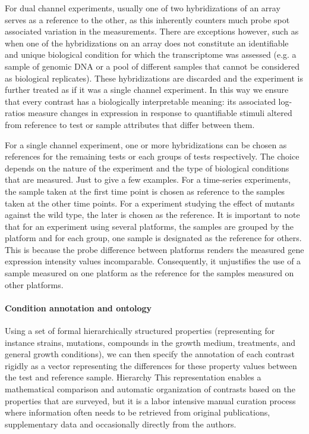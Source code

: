 For dual channel experiments, usually one of two hybridizations of an array
serves as a reference to the other, as this inherently counters much probe spot
associated variation in the measurements.
%
There are exceptions however, such as when one of the hybridizations on an
array does not constitute an identifiable and unique biological condition for
which the transcriptome was assessed (e.g. a sample of genomic DNA or a pool of
different samples that cannot be considered as biological replicates).
%
These hybridizations are discarded and the experiment is further treated as if
it was a single channel experiment.
%
In this way we ensure that every contrast has a biologically interpretable
meaning: its associated log-ratios measure changes in expression in response to
quantifiable stimuli altered from reference to test or sample attributes that
differ between them.

For a single channel experiment, one or more hybridizations can be chosen as
references for the remaining tests or each groups of tests respectively.
%
The choice depends on the nature of the experiment and the type of biological
conditions that are measured.
%
Just to give a few examples.  For a time-series experiments, the sample taken
at the first time point is chosen as reference to the samples taken at the
other time points.  For a experiment studying the effect of mutants against the
wild type, the later is chosen as the reference.
%
It is important to note that for an experiment using several platforms, the
samples are grouped by the platform and for each group, one sample is
designated as the reference for others.  This is because the probe difference
between platforms renders the measured gene expression intensity values
incomparable.  Consequently, it unjustifies the use of a sample measured on one
platform as the reference for the samples measured on other platforms.




\paragraph{Condition annotation and ontology}
Using a set of formal hierarchically structured properties (representing for
instance strains, mutations, compounds in the growth medium, treatments, and
general growth conditions), we can then specify the annotation of each contrast
rigidly as a vector representing the differences for these property values
between the test and reference sample.
%
Hierarchy
%
This representation enables a mathematical comparison and automatic
organization of contrasts based on the properties that are surveyed, but it is
a labor intensive manual curation process where information often needs to be
retrieved from original publications, supplementary data and occasionally
directly from the authors.


